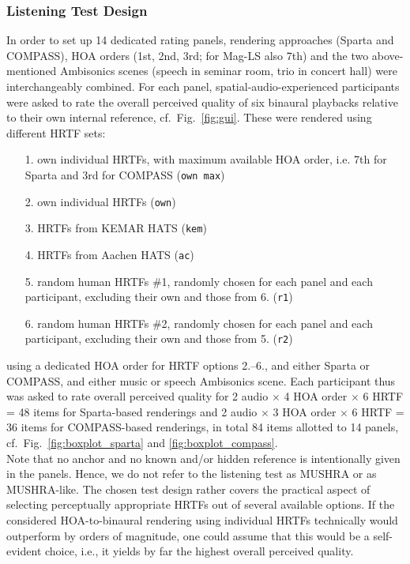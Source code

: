\documentclass[conference]{IEEEtran}
\def\NewL{\\\noindent\hspace*{5mm}}
\begin{document}
\subsubsection{Listening Test Design}
%
In order to set up 14 dedicated rating panels, rendering approaches (Sparta and COMPASS), HOA orders (1st, 2nd, 3rd; for Mag-LS also 7th) and the two above-mentioned Ambisonics scenes (speech in seminar room, trio in concert hall) were interchangeably combined.
%
For each panel, spatial-audio-experienced participants were asked to rate the overall perceived quality of six binaural playbacks relative to their own internal reference, cf.~Fig.~\ref{fig:gui}.
%
These were rendered using different HRTF sets:
%
\begin{itemize}
\item[1.] own individual HRTFs, with maximum available HOA order, i.e. 7th for Sparta and 3rd for COMPASS (\texttt{own max})
\item[2.] own individual HRTFs (\texttt{own})
\item[3.] HRTFs from KEMAR HATS (\texttt{kem})
\item[4.] HRTFs from Aachen HATS (\texttt{ac})
\item[5.] random human HRTFs \#1, randomly chosen for each panel and each participant, excluding their own and those from 6. (\texttt{r1})
\item[6.] random human HRTFs \#2, randomly chosen for each panel and each participant, excluding their own and those from 5. (\texttt{r2})
\end{itemize}
using a dedicated HOA order for HRTF options 2.--6., and either Sparta or COMPASS, and either music or speech Ambisonics scene.
%
Each participant thus was asked to rate overall perceived quality for
2 audio $\times$ 4 HOA order $\times$ 6 HRTF = 48 items for Sparta-based renderings and 2 audio $\times$ 3 HOA order $\times$ 6 HRTF = 36 items for COMPASS-based renderings, in total 84 items allotted to 14 panels, cf.~Fig.~\ref{fig:boxplot_sparta} and \ref{fig:boxplot_compass}.
%
\NewL Note that no anchor and no known and/or hidden reference is intentionally given in the panels.
%
Hence, we do not refer to the listening test as MUSHRA or as MUSHRA-like.
%
The chosen test design rather covers the practical aspect of selecting perceptually appropriate HRTFs out of several available options.
%
If the considered HOA-to-binaural rendering using individual HRTFs technically would outperform by orders of magnitude, one could assume that this would be a self-evident choice, i.e., it yields by far the highest overall perceived quality.
\end{document}
